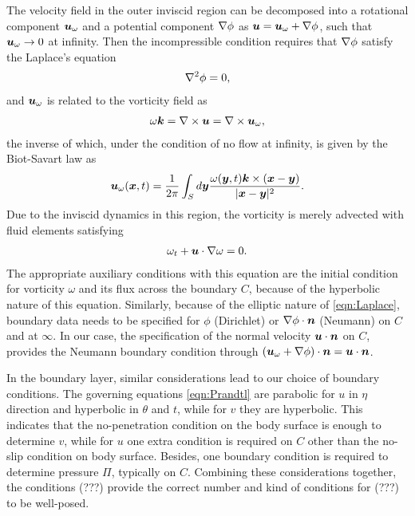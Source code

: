 The velocity field in the outer inviscid region can be decomposed into a rotational component $\boldsymbol{u}_{\omega}$ and a potential component $\nabla \phi$ as $\boldsymbol{u} = \boldsymbol{u}_{\omega} + \nabla \phi$, such that $\boldsymbol{u}_\omega\to 0$ at infinity.
Then the incompressible condition requires that $\nabla \phi$ satisfy the Laplace's equation
\begin{align}
\label{eqn:Laplace}
\nabla^2 \phi = 0,
\end{align}
and $\boldsymbol{u}_\omega$ is related to the vorticity field as
\begin{align}
\omega \boldsymbol{k} = \nabla \times \boldsymbol{u} = \nabla \times \boldsymbol{u}_{\omega},
\end{align}
the inverse of which, under the condition of no flow at infinity, is given by the Biot-Savart law as
\begin{align}
\label{eqn:Biot-Savart}
\boldsymbol{u}_{\omega} (\boldsymbol{x}, t) =  \frac{1}{2\pi} \int_{S} d\boldsymbol{y} \frac{\omega(\boldsymbol{y}, t)\boldsymbol{k} \times (\boldsymbol{x} - \boldsymbol{y})}{|\boldsymbol{x} - \boldsymbol{y}|^2}.
\end{align}
Due to the inviscid dynamics in this region, the vorticity is merely advected with fluid elements satisfying
\begin{align}
 \omega_t + \boldsymbol{u}\cdot\nabla\omega = 0. \label{eqn:Vorticity}
\end{align}
The appropriate auxiliary conditions with this equation are the initial condition for vorticity $\omega$ and its flux across the boundary $C$, because of the hyperbolic nature of this equation. 
Similarly, because of the elliptic nature of \eqref{eqn:Laplace}, boundary data needs to be specified for $\phi$ (Dirichlet) or $\nabla \phi \cdot \boldsymbol{n}$ (Neumann) on $C$ and at $\infty$.
In our case, the specification of the normal velocity $\boldsymbol{u} \cdot \boldsymbol{n}$ on $C$, provides the Neumann boundary condition through $(\boldsymbol{u}_\omega + \nabla \phi) \cdot \boldsymbol{n} = \boldsymbol{u} \cdot \boldsymbol{n}$.

In the boundary layer, similar considerations lead to our choice of boundary conditions.
The governing equations \eqref{eqn:Prandtl} are parabolic for $u$ in $\eta$ direction and hyperbolic in $\theta$ and $t$, while for $v$ they are hyperbolic. 
This indicates that the no-penetration condition on the body surface is enough to determine $v$, while for $u$ one extra condition is required on $C$ other than the no-slip condition on body surface. 
Besides, one boundary condition is required to determine pressure $\Pi$, typically on $C$.
Combining these considerations together, the conditions (???) provide the correct number and kind of conditions for (???) to be well-posed. 

